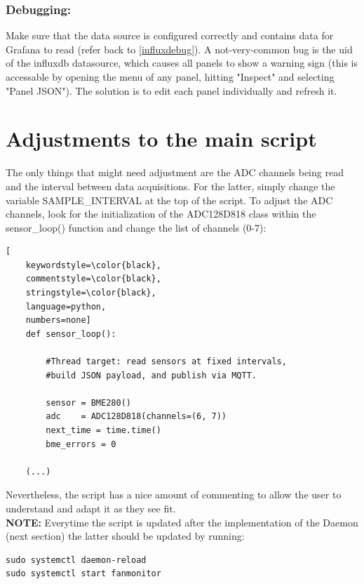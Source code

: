 \documentclass[onecolumn]{article}
\begin{document}
\subsubsection{Debugging:}
Make sure that the data source is configured correctly and contains data for Grafana to read (refer back to \ref{influxdebug}). A not-very-common bug is the uid of the influxdb datasource, which causes all panels to show a warning sign (this is accessable by opening the menu of any panel, hitting "Inspect" and selecting "Panel JSON"). The solution is to edit each panel individually and refresh it. 
   



\section{Adjustments to the main script}

The only things that might need adjustment are the ADC channels being read and the interval between data acquisitions. For the latter, simply change the variable SAMPLE\_INTERVAL at the top of the script. To adjust the ADC channels, look for the initialization of the ADC128D818 class within the sensor\_loop() function and change the list of channels (0-7):

\begin{lstlisting}[
    keywordstyle=\color{black},
    commentstyle=\color{black},
    stringstyle=\color{black},
    language=python,
    numbers=none]
    def sensor_loop():
        
        #Thread target: read sensors at fixed intervals,
        #build JSON payload, and publish via MQTT.
        
        sensor = BME280()
        adc    = ADC128D818(channels=(6, 7))
        next_time = time.time()
        bme_errors = 0

    (...)
\end{lstlisting}

Nevertheless, the script has a nice amount of commenting to allow the user to understand and adapt it as they see fit.\\

\textbf{NOTE:} Everytime the script is updated after the implementation of the Daemon (next section) the latter should be updated by running:

\begin{lstlisting}[numbers=none]
sudo systemctl daemon-reload
sudo systemctl start fanmonitor
\end{lstlisting}
\end{document}
